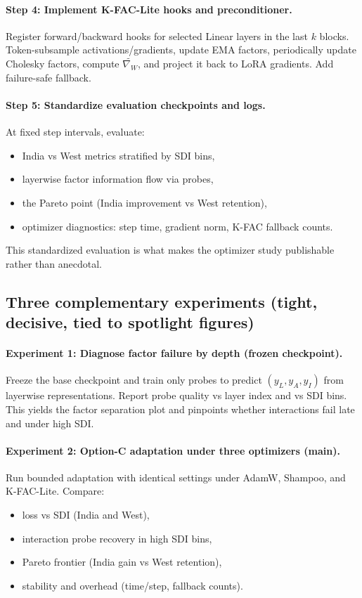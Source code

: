 \paragraph{Step 4: Implement K-FAC-Lite hooks and preconditioner.}
Register forward/backward hooks for selected Linear layers in the last $k$ blocks. Token-subsample activations/gradients, update EMA factors, periodically update Cholesky factors, compute $\widetilde{\nabla_W}$, and project it back to LoRA gradients. Add failure-safe fallback.

\paragraph{Step 5: Standardize evaluation checkpoints and logs.}
At fixed step intervals, evaluate:
\begin{itemize}[leftmargin=*,itemsep=2pt]
\item India vs West metrics stratified by SDI bins,
\item layerwise factor information flow via probes,
\item the Pareto point (India improvement vs West retention),
\item optimizer diagnostics: step time, gradient norm, K-FAC fallback counts.
\end{itemize}
This standardized evaluation is what makes the optimizer study publishable rather than anecdotal.

\subsection{Three complementary experiments (tight, decisive, tied to spotlight figures)}
\label{sec:three_experiments_tied}

\paragraph{Experiment 1: Diagnose factor failure by depth (frozen checkpoint).}
Freeze the base checkpoint and train only probes to predict $(y_L,y_A,y_I)$ from layerwise representations. Report probe quality vs layer index and vs SDI bins. This yields the factor separation plot and pinpoints whether interactions fail late and under high SDI.

\paragraph{Experiment 2: Option-C adaptation under three optimizers (main).}
Run bounded adaptation with identical settings under AdamW, Shampoo, and K-FAC-Lite. Compare:
\begin{itemize}[leftmargin=*,itemsep=2pt]
\item loss vs SDI (India and West),
\item interaction probe recovery in high SDI bins,
\item Pareto frontier (India gain vs West retention),
\item stability and overhead (time/step, fallback counts).
\end{itemize}

